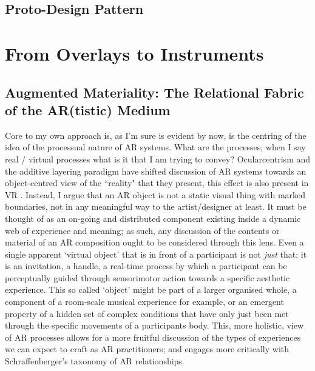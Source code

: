 \subsection{Proto-Design Pattern}



\section{From Overlays to Instruments} \label{sec: discussion-medium}
\subsection[Augmented Materiality]{Augmented Materiality: The Relational Fabric of the AR(tistic) Medium} \label{sec: discussion-medium-material}
Core to my own approach is, as I'm sure is evident by now, is the centring of the idea of the processual nature of AR systems. What are the processes; when I say real / virtual processes what is it that I am trying to convey? Ocularcentrism and the additive layering paradigm have shifted discussion of AR systems towards an object-centred view of the ``reality" that they present, this effect is also present in VR \citep[]{hovhannisyan2019}. Instead, I argue that an AR object is not a static visual thing with marked boundaries, not in any meaningful way to the artist/designer at least. It must be thought of as an on-going and distributed component existing inside a dynamic web of experience and meaning; as such, any discussion of the contents or material of an AR composition ought to be considered through this lens. Even a single apparent `virtual object' that is in front of a participant is not \textit{just} that; it is an invitation, a handle, a real-time process by which a participant can be perceptually guided through sensorimotor action towards a specific aesthetic experience. This so called `object' might be part of a larger organised whole, a component of a room-scale musical experience for example, or an emergent property of a hidden set of complex conditions that have only just been met through the specific movements of a participants body. This, more holistic, view of AR processes allows for a more fruitful discussion of the types of experiences we can expect to craft as AR practitioners; and engages more critically with Schraffenberger's taxonomy of AR relationships.

